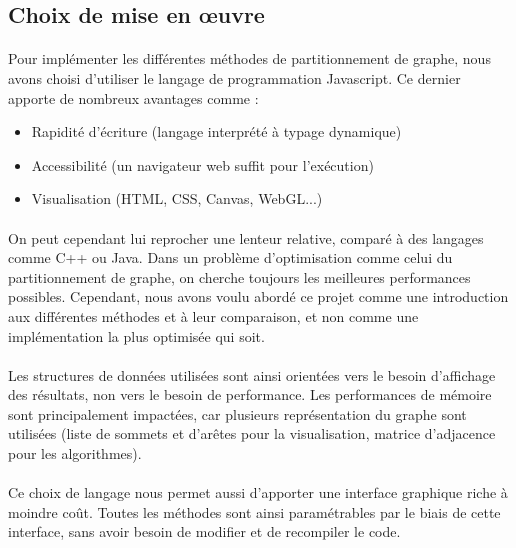 \documentclass[12pt]{article}
\begin{document}
\subsection{Choix de mise en œuvre}

\paragraph{}Pour implémenter les différentes méthodes de partitionnement de graphe, nous avons choisi d'utiliser le langage de programmation Javascript. Ce dernier apporte de nombreux avantages comme :
\begin{itemize}
	\item Rapidité d'écriture (langage interprété à typage dynamique)
	\item Accessibilité (un navigateur web suffit pour l'exécution)
	\item Visualisation (HTML, CSS, Canvas, WebGL...)
\end{itemize}

\paragraph{}On peut cependant lui reprocher une lenteur relative, comparé à des langages comme C++ ou Java. Dans un problème d'optimisation comme celui du partitionnement de graphe, on cherche toujours les meilleures performances possibles. Cependant, nous avons voulu abordé ce projet comme une introduction aux différentes méthodes et à leur comparaison, et non comme une implémentation la plus optimisée qui soit.

\paragraph{}Les structures de données utilisées sont ainsi orientées vers le besoin d'affichage des résultats, non vers le besoin de performance. Les performances de mémoire sont principalement impactées, car plusieurs représentation du graphe sont utilisées (liste de sommets et d'arêtes pour la visualisation, matrice d'adjacence pour les algorithmes).

\paragraph{}Ce choix de langage nous permet aussi d'apporter une interface graphique riche à moindre coût. Toutes les méthodes sont ainsi paramétrables par le biais de cette interface, sans avoir besoin de modifier et de recompiler le code.
\end{document}
